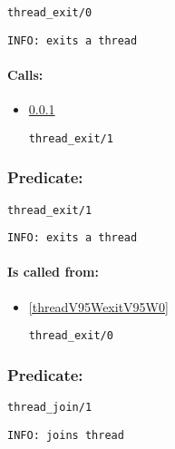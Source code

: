 \begin{verbatim}
thread_exit/0
\end{verbatim}

{\small \begin{verbatim}
INFO: exits a thread

\end{verbatim}}
\paragraph{Calls:} 
\begin{itemize}
\item \ref{threadV95WexitV95W1} 
\begin{verbatim}
thread_exit/1
\end{verbatim}

\end{itemize}

\subsubsection{Predicate:} \label{threadV95WexitV95W1}

\begin{verbatim}
thread_exit/1
\end{verbatim}

{\small \begin{verbatim}
INFO: exits a thread

\end{verbatim}}
\paragraph{Is called from:} 
\begin{itemize}
\item \ref{threadV95WexitV95W0} 
\begin{verbatim}
thread_exit/0
\end{verbatim}

\end{itemize}

\subsubsection{Predicate:} \label{threadV95WjoinV95W1}

\begin{verbatim}
thread_join/1
\end{verbatim}

{\small \begin{verbatim}
INFO: joins thread

\end{verbatim}}

